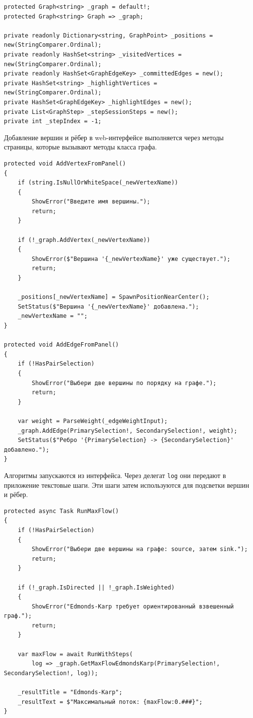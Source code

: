 \documentclass[pract]{SCWorks}
\newcommand{\smalltt}[1]{{\footnotesize\texttt{#1}}}
\begin{document}
    \begin{verbatim}
protected Graph<string> _graph = default!;
protected Graph<string> Graph => _graph;

private readonly Dictionary<string, GraphPoint> _positions = new(StringComparer.Ordinal);
private readonly HashSet<string> _visitedVertices = new(StringComparer.Ordinal);
private readonly HashSet<GraphEdgeKey> _committedEdges = new();
private HashSet<string> _highlightVertices = new(StringComparer.Ordinal);
private HashSet<GraphEdgeKey> _highlightEdges = new();
private List<GraphStep> _stepSessionSteps = new();
private int _stepIndex = -1;
    \end{verbatim}

    Добавление вершин и рёбер в web-интерфейсе выполняется через методы страницы, которые вызывают методы класса графа.

    \begin{verbatim}
protected void AddVertexFromPanel()
{
    if (string.IsNullOrWhiteSpace(_newVertexName))
    {
        ShowError("Введите имя вершины.");
        return;
    }

    if (!_graph.AddVertex(_newVertexName))
    {
        ShowError($"Вершина '{_newVertexName}' уже существует.");
        return;
    }

    _positions[_newVertexName] = SpawnPositionNearCenter();
    SetStatus($"Вершина '{_newVertexName}' добавлена.");
    _newVertexName = "";
}

protected void AddEdgeFromPanel()
{
    if (!HasPairSelection)
    {
        ShowError("Выбери две вершины по порядку на графе.");
        return;
    }

    var weight = ParseWeight(_edgeWeightInput);
    _graph.AddEdge(PrimarySelection!, SecondarySelection!, weight);
    SetStatus($"Ребро '{PrimarySelection} -> {SecondarySelection}' добавлено.");
}
    \end{verbatim}

    Алгоритмы запускаются из интерфейса.
    Через делегат \smalltt{log} они передают в приложение текстовые шаги.
    Эти шаги затем используются для подсветки вершин и рёбер.

    \begin{verbatim}
protected async Task RunMaxFlow()
{
    if (!HasPairSelection)
    {
        ShowError("Выбери две вершины на графе: source, затем sink.");
        return;
    }

    if (!_graph.IsDirected || !_graph.IsWeighted)
    {
        ShowError("Edmonds-Karp требует ориентированный взвешенный граф.");
        return;
    }

    var maxFlow = await RunWithSteps(
        log => _graph.GetMaxFlowEdmondsKarp(PrimarySelection!, SecondarySelection!, log));

    _resultTitle = "Edmonds-Karp";
    _resultText = $"Максимальный поток: {maxFlow:0.###}";
}
    \end{verbatim}
\end{document}
